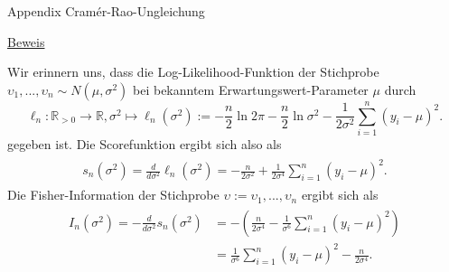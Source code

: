 \documentclass[
  8pt,
  ignorenonframetext,
]{beamer}
\newcommand{\ups} {\upsilon}
\begin{document}
\begin{frame}{Appendix \textbar{} Cramér-Rao-Ungleichung}
\protect\hypertarget{appendix-cramuxe9r-rao-ungleichung-14}{}
\footnotesize

\underline{Beweis}

Wir erinnern uns, dass die Log-Likelihood-Funktion der Stichprobe
\(\ups_1,...,\ups_n \sim N(\mu,\sigma^2)\) bei bekanntem
Erwartungswert-Parameter \(\mu\) durch \begin{equation}
\ell_n : \mathbb{R}_{>0} \to \mathbb{R},
\sigma^2 \mapsto \ell_n(\sigma^2)
:= -\frac{n}{2} \ln 2\pi - \frac{n}{2} \ln \sigma^2  - \frac{1}{2\sigma^2}\sum_{i=1}^n(y_i-\mu)^2.
\end{equation} gegeben ist. Die Scorefunktion ergibt sich also als
\begin{align}
\begin{split}
s_n(\sigma^2)
 = \frac{d}{d\sigma^2}\ell_n(\sigma^2)
 = - \frac{n}{2 \sigma^2} + \frac{1}{2\sigma^4}\sum_{i=1}^n(y_i-\mu)^2.
\end{split}
\end{align} Die Fisher-Information der Stichprobe
\(\ups := \ups_1,...,\ups_n\) ergibt sich als \begin{align}
\begin{split}
I_n(\sigma^2)
= -\frac{d}{d\sigma^2}s_n(\sigma^2)
& = - \left(\frac{n}{2\sigma^4} - \frac{1}{\sigma^6}\sum_{i=1}^n (y_i - \mu)^2\right) \\
& = \frac{1}{\sigma^6}\sum_{i=1}^n (y_i - \mu)^2 - \frac{n}{2\sigma^4}.
\end{split}
\end{align}
\end{frame}
\end{document}
